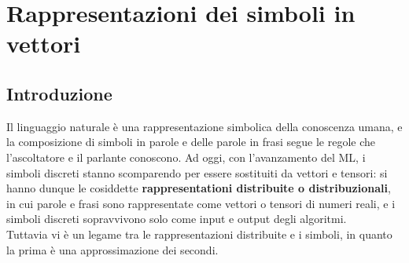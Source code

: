 \usepackage{amsmath}

\chapter{Rappresentazioni dei simboli in vettori}

\section{Introduzione}
Il linguaggio naturale è una rappresentazione simbolica della conoscenza umana, e la composizione di simboli in parole e delle parole in frasi segue le regole che l'ascoltatore e il parlante conoscono. Ad oggi, con l'avanzamento del ML, i simboli discreti stanno scomparendo per essere sostituiti da vettori e tensori: si hanno dunque le cosiddette \textbf{rappresentationi distribuite o distribuzionali}, in cui parole e frasi sono rappresentate come vettori o tensori di numeri reali, e i simboli discreti sopravvivono solo come input e output degli algoritmi. \\
Tuttavia vi è un legame tra le rappresentazioni distribuite e i simboli, in quanto la prima è una approssimazione dei secondi. 

